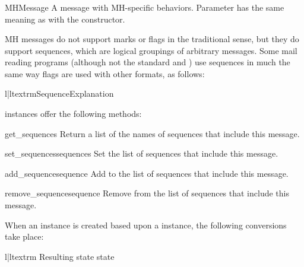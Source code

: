 \subsubsection{}
\label{mailbox-mhmessage}

\begin{classdesc}{MHMessage}{}
A message with MH-specific behaviors. Parameter  has the same
meaning as with the  constructor.
\end{classdesc}

MH messages do not support marks or flags in the traditional sense, but they do
support sequences, which are logical groupings of arbitrary messages. Some mail
reading programs (although not the standard  and ) use
sequences in much the same way flags are used with other formats, as follows:

\begin{tableii}{l|l}{textrm}{Sequence}{Explanation}
\end{tableii}

 instances offer the following methods:

\begin{methoddesc}{get_sequences}{}
Return a list of the names of sequences that include this message.
\end{methoddesc}

\begin{methoddesc}{set_sequences}{sequences}
Set the list of sequences that include this message.
\end{methoddesc}

\begin{methoddesc}{add_sequence}{sequence}
Add  to the list of sequences that include this message.
\end{methoddesc}

\begin{methoddesc}{remove_sequence}{sequence}
Remove  from the list of sequences that include this message.
\end{methoddesc}

When an  instance is created based upon a
 instance, the following conversions take place:

\begin{tableii}{l|l}{textrm}
    {Resulting state}{ state}
\end{tableii}

